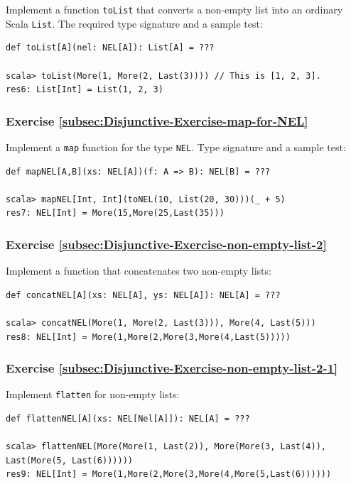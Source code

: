 Implement a function \lstinline!toList! that converts a non-empty
list into an ordinary Scala \lstinline!List!. The required type signature
and a sample test:
\begin{lstlisting}
def toList[A](nel: NEL[A]): List[A] = ???

scala> toList(More(1, More(2, Last(3)))) // This is [1, 2, 3].
res6: List[Int] = List(1, 2, 3)
\end{lstlisting}


\subsubsection{Exercise \label{subsec:Disjunctive-Exercise-map-for-NEL}\ref{subsec:Disjunctive-Exercise-map-for-NEL}}

Implement a \lstinline!map! function for the type \lstinline!NEL!.
Type signature and a sample test:
\begin{lstlisting}
def mapNEL[A,B](xs: NEL[A])(f: A => B): NEL[B] = ???

scala> mapNEL[Int, Int](toNEL(10, List(20, 30)))(_ + 5)
res7: NEL[Int] = More(15,More(25,Last(35)))
\end{lstlisting}


\subsubsection{Exercise \label{subsec:Disjunctive-Exercise-non-empty-list-2}\ref{subsec:Disjunctive-Exercise-non-empty-list-2}}

Implement a function that concatenates two non-empty lists:
\begin{lstlisting}
def concatNEL[A](xs: NEL[A], ys: NEL[A]): NEL[A] = ???

scala> concatNEL(More(1, More(2, Last(3))), More(4, Last(5)))
res8: NEL[Int] = More(1,More(2,More(3,More(4,Last(5)))))
\end{lstlisting}


\subsubsection{Exercise \label{subsec:Disjunctive-Exercise-non-empty-list-2-1}\ref{subsec:Disjunctive-Exercise-non-empty-list-2-1}}

Implement \lstinline!flatten! for non-empty lists:
\begin{lstlisting}
def flattenNEL[A](xs: NEL[Nel[A]]): NEL[A] = ???

scala> flattenNEL(More(More(1, Last(2)), More(More(3, Last(4)), Last(More(5, Last(6))))))
res9: NEL[Int] = More(1,More(2,More(3,More(4,More(5,Last(6))))))
\end{lstlisting}



